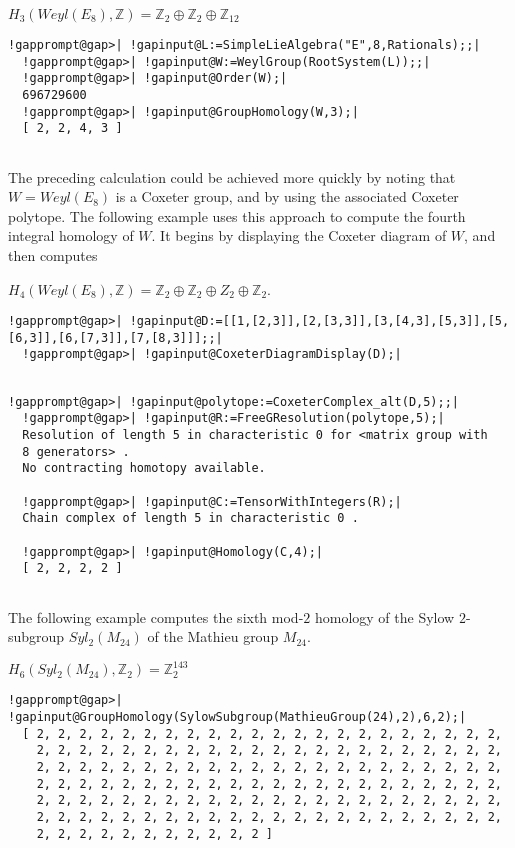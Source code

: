 \documentclass[a4paper,11pt]{report}
\begin{document}
{{$H_3(Weyl(E_8),\mathbb Z) = \mathbb Z_2 \oplus \mathbb Z_2 \oplus \mathbb
Z_{12}$ 
\begin{Verbatim}[commandchars=!@|,fontsize=\small,frame=single,label=Example]
  !gapprompt@gap>| !gapinput@L:=SimpleLieAlgebra("E",8,Rationals);;|
  !gapprompt@gap>| !gapinput@W:=WeylGroup(RootSystem(L));;|
  !gapprompt@gap>| !gapinput@Order(W);|
  696729600
  !gapprompt@gap>| !gapinput@GroupHomology(W,3);|
  [ 2, 2, 4, 3 ]
  
\end{Verbatim}
 

The preceding calculation could be achieved more quickly by noting that $W=Weyl(E_8)$ is a Coxeter group, and by using the associated Coxeter polytope. The
following example uses this approach to compute the fourth integral homology
of $W$. It begins by displaying the Coxeter diagram of $W$, and then computes 

$H_4(Weyl(E_8),\mathbb Z) = \mathbb Z_2 \oplus \mathbb Z_2 \oplus Z_2 \oplus
\mathbb Z_2$. 
\begin{Verbatim}[commandchars=!@|,fontsize=\small,frame=single,label=Example]
  !gapprompt@gap>| !gapinput@D:=[[1,[2,3]],[2,[3,3]],[3,[4,3],[5,3]],[5,[6,3]],[6,[7,3]],[7,[8,3]]];;|
  !gapprompt@gap>| !gapinput@CoxeterDiagramDisplay(D);|
  
\end{Verbatim}
  
\begin{Verbatim}[commandchars=!@|,fontsize=\small,frame=single,label=Example]
  !gapprompt@gap>| !gapinput@polytope:=CoxeterComplex_alt(D,5);;|
  !gapprompt@gap>| !gapinput@R:=FreeGResolution(polytope,5);|
  Resolution of length 5 in characteristic 0 for <matrix group with 
  8 generators> . 
  No contracting homotopy available. 
  
  !gapprompt@gap>| !gapinput@C:=TensorWithIntegers(R);|
  Chain complex of length 5 in characteristic 0 . 
  
  !gapprompt@gap>| !gapinput@Homology(C,4);|
  [ 2, 2, 2, 2 ]
  
\end{Verbatim}
 

The following example computes the sixth mod-$2$ homology of the Sylow $2$-subgroup $Syl_2(M_{24})$ of the Mathieu group $M_{24}$. 

$H_6(Syl_2(M_{24}),\mathbb Z_2) = \mathbb Z_2^{143}$ 
\begin{Verbatim}[commandchars=!@|,fontsize=\small,frame=single,label=Example]
  !gapprompt@gap>| !gapinput@GroupHomology(SylowSubgroup(MathieuGroup(24),2),6,2);|
  [ 2, 2, 2, 2, 2, 2, 2, 2, 2, 2, 2, 2, 2, 2, 2, 2, 2, 2, 2, 2, 2, 2, 
    2, 2, 2, 2, 2, 2, 2, 2, 2, 2, 2, 2, 2, 2, 2, 2, 2, 2, 2, 2, 2, 2, 
    2, 2, 2, 2, 2, 2, 2, 2, 2, 2, 2, 2, 2, 2, 2, 2, 2, 2, 2, 2, 2, 2, 
    2, 2, 2, 2, 2, 2, 2, 2, 2, 2, 2, 2, 2, 2, 2, 2, 2, 2, 2, 2, 2, 2, 
    2, 2, 2, 2, 2, 2, 2, 2, 2, 2, 2, 2, 2, 2, 2, 2, 2, 2, 2, 2, 2, 2, 
    2, 2, 2, 2, 2, 2, 2, 2, 2, 2, 2, 2, 2, 2, 2, 2, 2, 2, 2, 2, 2, 2, 
    2, 2, 2, 2, 2, 2, 2, 2, 2, 2, 2 ]
  

\end{Verbatim}}}
\end{document}
